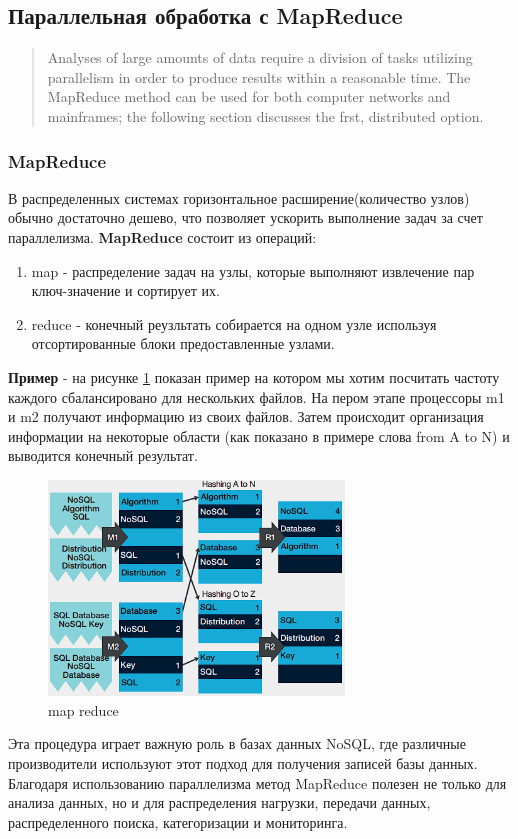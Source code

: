 \documentclass{article}
\begin{document}
\subsection{Параллельная обработка с MapReduce}
\begin{quote}
    Analyses of large amounts of data require a division of tasks utilizing parallelism in 
order to produce results within a reasonable time. The MapReduce method can be used 
for both computer networks and mainframes; the following section discusses the frst, 
distributed option.
\end{quote}
\subsubsection{MapReduce}
В распределенных системах горизонтальное расширение(количество узлов) обычно достаточно дешево, что позволяет ускорить выполнение задач за счет параллелизма.
\textbf{MapReduce} состоит из операций:
\begin{enumerate}
    \item map - распределение задач на узлы, которые выполняют извлечение пар ключ-значение и сортирует их.
    \item reduce - конечный реузльтать собирается на одном узле используя отсортированные блоки предоставленные узлами.
\end{enumerate}
\textbf{Пример} - на рисунке \ref{img9} показан пример на котором мы хотим посчитать частоту каждого сбалансировано для нескольких файлов.
На пером этапе процессоры m1 и m2 получают информацию из своих файлов. Затем происходит организация информации на некоторые области (как показано в примере слова from A to N) и выводится конечный результат.
\begin{figure}[ht]
    \centering
    \includegraphics[width=0.7\textwidth]{images/mapreduce.png}
    \caption{map reduce}
    \label{img9}
\end{figure}
Эта процедура играет важную роль в базах данных NoSQL, где различные производители используют этот подход для получения записей базы данных.
Благодаря использованию параллелизма метод MapReduce полезен не только для анализа данных, но и
для распределения нагрузки, передачи данных, распределенного поиска, категоризации и мониторинга.
\newpage
\end{document}
